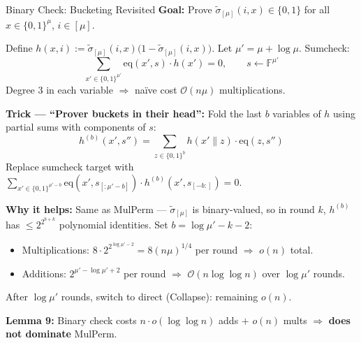 \documentclass[aspectratio=169,10pt]{beamer}
\newcommand{\F}{\mathbb{F}}
\newcommand{\B}{\{0,1\}}
\newcommand{\eq}{\mathrm{eq}}
\newcommand{\wt}[1]{\widetilde{#1}}
\newcommand{\bigO}{\mathcal{O}}
\begin{document}
\begin{frame}{Binary Check: Bucketing Revisited}
\textbf{Goal:} Prove $\wt{\sigma}_{[\mu]}(i, x) \in \{0,1\}$ for all $x \in \B^\mu$, $i \in [\mu]$.

\vspace{0.3em}
Define $h(x, i) := \wt{\sigma}_{[\mu]}(i, x)\bigl(1 - \wt{\sigma}_{[\mu]}(i, x)\bigr)$.  Let $\mu' = \mu + \log\mu$.  Sumcheck:
\[
  \sum_{x' \in \B^{\mu'}} \eq(x', s) \cdot h(x') = 0, \qquad s \leftarrow \F^{\mu'}
\]
Degree 3 in each variable $\Rightarrow$ na\"ive cost $\bigO(n\mu)$ multiplications.

\vspace{0.4em}
\textbf{Trick --- ``Prover buckets in their head'':} Fold the last $b$ variables of $h$ using partial sums with components of $s$:
\[
  h^{(b)}(x', s'') = \sum_{z \in \B^b} h(x' \| z) \cdot \eq(z, s'')
\]
Replace sumcheck target with $\sum_{x' \in \B^{\mu'-b}} \eq(x', s_{[:\mu'-b]}) \cdot h^{(b)}(x', s_{[-b:]}) = 0$.

\vspace{0.4em}
\textbf{Why it helps:} Same as MulPerm --- $\wt{\sigma}_{[\mu]}$ is binary-valued, so in round $k$, $h^{(b)}$ has $\le 2^{2^{b+k}}$ polynomial identities.  Set $b = \log\mu' - k - 2$:
\begin{itemize}
  \item Multiplications: $8 \cdot 2^{2^{\log\mu'-2}} = 8(n\mu)^{1/4}$ per round $\Rightarrow$ $o(n)$ total.
  \item Additions: $2^{\mu' - \log\mu' + 2}$ per round $\Rightarrow$ $\bigO(n \log\log n)$ over $\log\mu'$ rounds.
\end{itemize}
After $\log\mu'$ rounds, switch to direct (Collapse): remaining $o(n)$.

\vspace{0.3em}
\textbf{Lemma 9:} Binary check costs $n \cdot o(\log\log n)$ adds $+$ $o(n)$ mults $\Rightarrow$ \textbf{does not dominate} MulPerm.
\end{frame}
\end{document}
